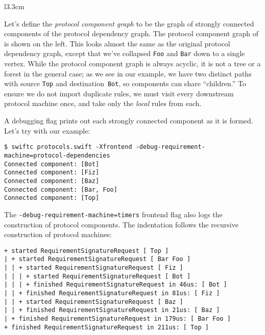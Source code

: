 \documentclass[../generics]{subfiles}
\begin{document}
\begin{wrapfigure}{l}{3.3cm}
\end{wrapfigure}

Let's define the \emph{protocol component graph} to be the graph of strongly connected components of the protocol dependency graph. The protocol component graph of  is shown on the left. This looks almost the same as the original protocol dependency graph, except that we've collapsed \texttt{Foo} and \texttt{Bar} down to a single vertex. While the protocol component graph is always acyclic, it is not a tree or a forest in the general case; as we see in our example, we have two distinct paths with source \texttt{Top} and destination~\texttt{Bot}, so components can share ``children.'' To ensure we do not import duplicate rules, we must visit every downstream protocol machine once, and take only the \emph{local} rules from each.

A debugging flag prints out each strongly connected component as it is formed. Let's try with our example:
\begin{Verbatim}[fontsize=\footnotesize,numbers=none]
$ swiftc protocols.swift -Xfrontend -debug-requirement-machine=protocol-dependencies
Connected component: [Bot]
Connected component: [Fiz]
Connected component: [Baz]
Connected component: [Bar, Foo]
Connected component: [Top]
\end{Verbatim}

The
\texttt{-debug-requirement-machine=timers} frontend flag also logs the construction of protocol components. The indentation follows the recursive construction of protocol machines:
\begin{Verbatim}[fontsize=\footnotesize,numbers=none]
+ started RequirementSignatureRequest [ Top ]
| + started RequirementSignatureRequest [ Bar Foo ]
| | + started RequirementSignatureRequest [ Fiz ]
| | | + started RequirementSignatureRequest [ Bot ]
| | | + finished RequirementSignatureRequest in 46us: [ Bot ]
| | + finished RequirementSignatureRequest in 81us: [ Fiz ]
| | + started RequirementSignatureRequest [ Baz ]
| | + finished RequirementSignatureRequest in 21us: [ Baz ]
| + finished RequirementSignatureRequest in 179us: [ Bar Foo ]
+ finished RequirementSignatureRequest in 211us: [ Top ]
\end{Verbatim}
\end{document}
